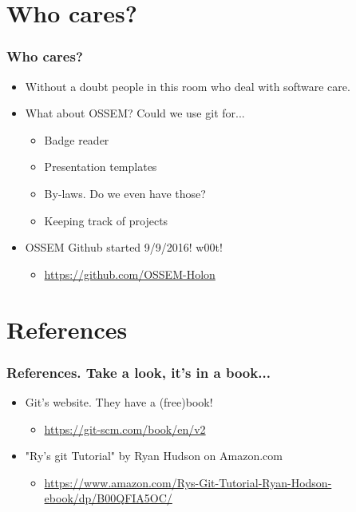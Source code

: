\documentclass{beamer}
\begin{document}
\section{Who cares?}
\begin{frame}
    \frametitle{Who cares?}
    \begin{itemize}
        \item{Without a doubt people in this room who deal with software care.}
        \item{What about OSSEM? Could we use git for...}
            \begin{itemize}
                \item{Badge reader}
                \item{Presentation templates}
                \item{By-laws. Do we even have those?}
                \item{Keeping track of projects}
            \end{itemize}
        \item{OSSEM Github started 9/9/2016! w00t!}
            \begin{itemize}
                \item{\url{https://github.com/OSSEM-Holon}}
            \end{itemize}
    \end{itemize}
\end{frame}

\section{References}
\begin{frame}
    \frametitle{References. Take a look, it's in a book...}
    \begin{itemize}
        \item{Git's website. They have a (free)book!}
            \begin{itemize}
                \item{\url{https://git-scm.com/book/en/v2}}
            \end{itemize}
        \item{"Ry's git Tutorial" by Ryan Hudson on Amazon.com}
            \begin{itemize}
                \item{\url{https://www.amazon.com/Rys-Git-Tutorial-Ryan-Hodson-ebook/dp/B00QFIA5OC/}} 
            \end{itemize}
    \end{itemize}
\end{frame}
\end{document}
